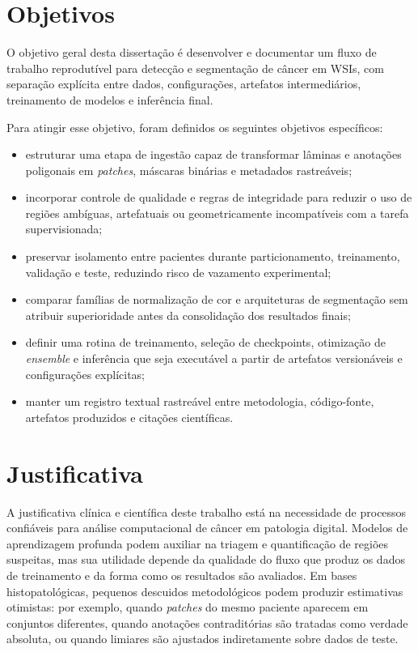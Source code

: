 \section{Objetivos}\label{sec:objetivos}

O objetivo geral desta dissertação é desenvolver e documentar um fluxo de
trabalho reprodutível para detecção e segmentação de câncer em WSIs, com
separação explícita entre dados, configurações, artefatos intermediários,
treinamento de modelos e inferência final.

Para atingir esse objetivo, foram definidos os seguintes objetivos específicos:
\begin{itemize}
    \item estruturar uma etapa de ingestão capaz de transformar lâminas e
    anotações poligonais em \textit{patches}, máscaras binárias e metadados
    rastreáveis;

    \item incorporar controle de qualidade e regras de integridade para reduzir
    o uso de regiões ambíguas, artefatuais ou geometricamente incompatíveis com
    a tarefa supervisionada;

    \item preservar isolamento entre pacientes durante particionamento,
    treinamento, validação e teste, reduzindo risco de vazamento experimental;

    \item comparar famílias de normalização de cor e arquiteturas de
    segmentação sem atribuir superioridade antes da consolidação dos resultados
    finais;

    \item definir uma rotina de treinamento, seleção de checkpoints,
    otimização de \textit{ensemble} e inferência que seja executável a partir de
    artefatos versionáveis e configurações explícitas;

    \item manter um registro textual rastreável entre metodologia, código-fonte,
    artefatos produzidos e citações científicas.
\end{itemize}

\section{Justificativa}\label{sec:justificativa}

A justificativa clínica e científica deste trabalho está na necessidade de
processos confiáveis para análise computacional de câncer em patologia digital.
Modelos de aprendizagem profunda podem auxiliar na triagem e quantificação de
regiões suspeitas, mas sua utilidade depende da qualidade do fluxo que produz os
dados de treinamento e da forma como os resultados são avaliados. Em bases
histopatológicas, pequenos descuidos metodológicos podem produzir estimativas
otimistas: por exemplo, quando \textit{patches} do mesmo paciente aparecem em
conjuntos diferentes, quando anotações contraditórias são tratadas como verdade
absoluta, ou quando limiares são ajustados indiretamente sobre dados de teste.

